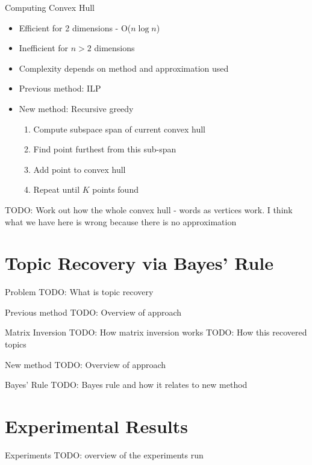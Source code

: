 \documentclass{lecture}
\begin{document}
\begin{plain}{Computing Convex Hull}
\begin{itemize}
\item Efficient for 2 dimensions - O($n\log{n}$)
\item Inefficient for $n>2$ dimensions
\item Complexity depends on method and approximation used
\item Previous method: ILP
\item New method: Recursive greedy
\begin{enumerate}
\item Compute subspace span of current convex hull
\item Find point furthest from this sub-span
\item Add point to convex hull
\item Repeat until $K$ points found
\end{enumerate}
\end{itemize}
TODO: Work out how the whole convex hull - words as vertices work. I think what we have here is wrong because there is no approximation
\end{plain}

\section[Topic Recovery]{Topic Recovery via Bayes' Rule}
\begin{plain}{Problem}
TODO: What is topic recovery
\end{plain}

\begin{plain}{Previous method}
TODO: Overview of approach
\end{plain}

\begin{plain}{Matrix Inversion}
TODO: How matrix inversion works
TODO: How this recovered topics
\end{plain}

\begin{plain}{New method}
TODO: Overview of approach
\end{plain}

\begin{plain}{Bayes' Rule}
TODO: Bayes rule and how it relates to new method
\end{plain}

\section[Results]{Experimental Results}
\begin{plain}{Experiments}
TODO: overview of the experiments run
\end{plain}
\end{document}
